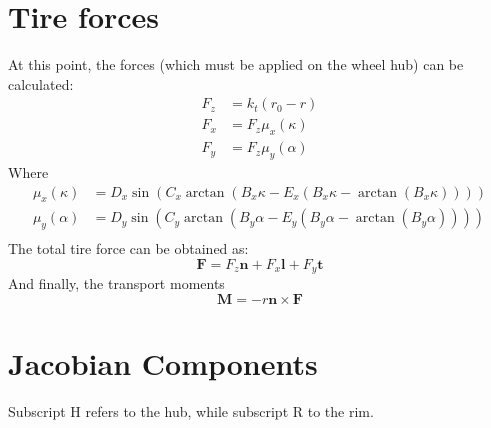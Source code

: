 \section{Tire forces}

At this point, the forces (which must be applied on the wheel hub) can be calculated:
\begin{equation}
    \begin{split}
        F_z &= k_t\left(r_0 - r\right)\\
        F_x &= F_z \mu_x(\kappa)\\
        F_y &= F_z \mu_y(\alpha)
    \end{split}
\end{equation}
Where
\begin{equation}
    \begin{split}
        \mu_x(\kappa) &= D_x\sin(C_x\arctan(B_x\kappa-E_x(B_x\kappa-\arctan(B_x\kappa))))\\
        \mu_y(\alpha) &= D_y\sin(C_y\arctan(B_y\alpha-E_y(B_y\alpha-\arctan(B_y\alpha))))\\
    \end{split}
\end{equation}
The total tire force can be obtained as:
\begin{equation}
    \mathbf{F} = F_z \mathbf{n} + F_x \mathbf{l} + F_y \mathbf{t}
\end{equation}
And finally, the transport moments
\begin{equation}
    \mathbf{M} = -r \mathbf{n} \times \mathbf{F}
\end{equation}

\section{Jacobian Components}
Subscript H refers to the hub, while subscript R to the rim.
